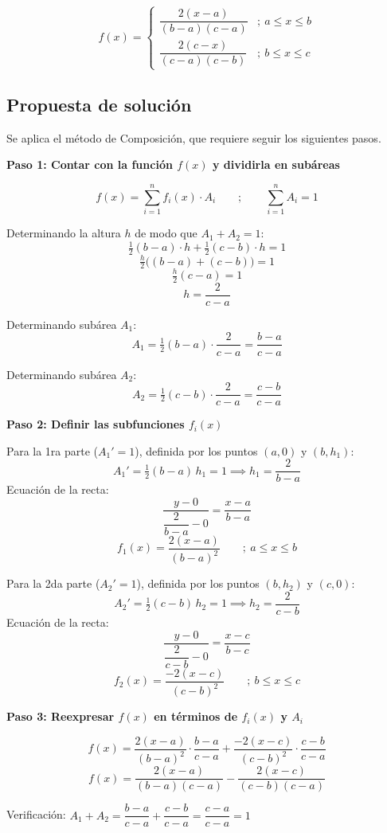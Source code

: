 \documentclass[12pt, a4paper]{article}
\begin{document}
\[
f(x)=\begin{cases}
\dfrac{2(x-a)}{(b-a)(c-a)} &;\ a \leq x \leq b \\[8pt]
\dfrac{2(c-x)}{(c-a)(c-b)} &;\ b \leq x \leq c
\end{cases}
\]

\subsection{Propuesta de solución}

Se aplica el método de Composición, que requiere seguir los siguientes pasos.

\textbf{Paso 1: Contar con la función $f(x)$ y dividirla en subáreas}

\[
f(x) = \sum_{i=1}^{n} f_i(x) \cdot A_i \qquad ; \qquad \sum_{i=1}^{n} A_i = 1
\]

Determinando la altura $h$ de modo que $A_1 + A_2 = 1$:
\[
\tfrac{1}{2}(b-a)\cdot h + \tfrac{1}{2}(c-b)\cdot h = 1
\]
\[
\tfrac{h}{2}\big((b-a)+(c-b)\big) = 1
\]
\[
\tfrac{h}{2}(c-a) = 1
\]
\[
h = \frac{2}{c-a}
\]

Determinando subárea $A_1$:
\[
A_1 = \tfrac{1}{2}(b-a)\cdot\frac{2}{c-a} = \frac{b-a}{c-a}
\]

Determinando subárea $A_2$:
\[
A_2 = \tfrac{1}{2}(c-b)\cdot\frac{2}{c-a} = \frac{c-b}{c-a}
\]

\textbf{Paso 2: Definir las subfunciones $f_i(x)$}

Para la 1ra parte ($A_1'=1$), definida por los puntos $(a,0)$ y $(b,h_1)$:
\[
A_1' = \tfrac{1}{2}(b-a)\,h_1 = 1 \implies h_1 = \frac{2}{b-a}
\]
Ecuación de la recta:
\[
\frac{y - 0}{\dfrac{2}{b-a} - 0} = \frac{x - a}{b - a}
\]
\[
f_1(x) = \frac{2(x-a)}{(b-a)^2} \qquad ;\ a \leq x \leq b
\]

Para la 2da parte ($A_2'=1$), definida por los puntos $(b,h_2)$ y $(c,0)$:
\[
A_2' = \tfrac{1}{2}(c-b)\,h_2 = 1 \implies h_2 = \frac{2}{c-b}
\]
Ecuación de la recta:
\[
\frac{y - 0}{\dfrac{2}{c-b} - 0} = \frac{x - c}{b - c}
\]
\[
f_2(x) = \frac{-2(x-c)}{(c-b)^2} \qquad ;\ b \leq x \leq c
\]

\textbf{Paso 3: Reexpresar $f(x)$ en términos de $f_i(x)$ y $A_i$}

\[
f(x) = \frac{2(x-a)}{(b-a)^2}\cdot\frac{b-a}{c-a} + \frac{-2(x-c)}{(c-b)^2}\cdot\frac{c-b}{c-a}
\]
\[
f(x) = \frac{2(x-a)}{(b-a)(c-a)} - \frac{2(x-c)}{(c-b)(c-a)}
\]

Verificación: $A_1+A_2 = \dfrac{b-a}{c-a}+\dfrac{c-b}{c-a} = \dfrac{c-a}{c-a} = 1$ \checkmark
\end{document}
